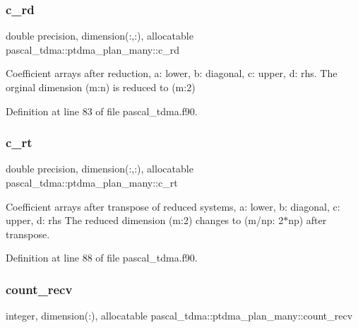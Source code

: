\subsubsection{\texorpdfstring{c\_rd}{c\_rd}}
{\footnotesize\ttfamily double precision, dimension(\+:,\+:), allocatable pascal\+\_\+tdma\+::ptdma\+\_\+plan\+\_\+many\+::c\+\_\+rd}



Coefficient arrays after reduction, a\+: lower, b\+: diagonal, c\+: upper, d\+: rhs. The orginal dimension (m\+:n) is reduced to (m\+:2) 



Definition at line 83 of file pascal\+\_\+tdma.\+f90.

\mbox{\label{structpascal__tdma_1_1ptdma__plan__many_a49336d53d19c274798e87ae33b530b33}} 
\subsubsection{\texorpdfstring{c\_rt}{c\_rt}}
{\footnotesize\ttfamily double precision, dimension(\+:,\+:), allocatable pascal\+\_\+tdma\+::ptdma\+\_\+plan\+\_\+many\+::c\+\_\+rt}



Coefficient arrays after transpose of reduced systems, a\+: lower, b\+: diagonal, c\+: upper, d\+: rhs The reduced dimension (m\+:2) changes to (m/np\+: 2$\ast$np) after transpose. 



Definition at line 88 of file pascal\+\_\+tdma.\+f90.

\mbox{\label{structpascal__tdma_1_1ptdma__plan__many_a30cebfb14bfcc955d3e98d9b1ea5fad7}} 
\subsubsection{\texorpdfstring{count\_recv}{count\_recv}}
{\footnotesize\ttfamily integer, dimension(\+:), allocatable pascal\+\_\+tdma\+::ptdma\+\_\+plan\+\_\+many\+::count\+\_\+recv}



